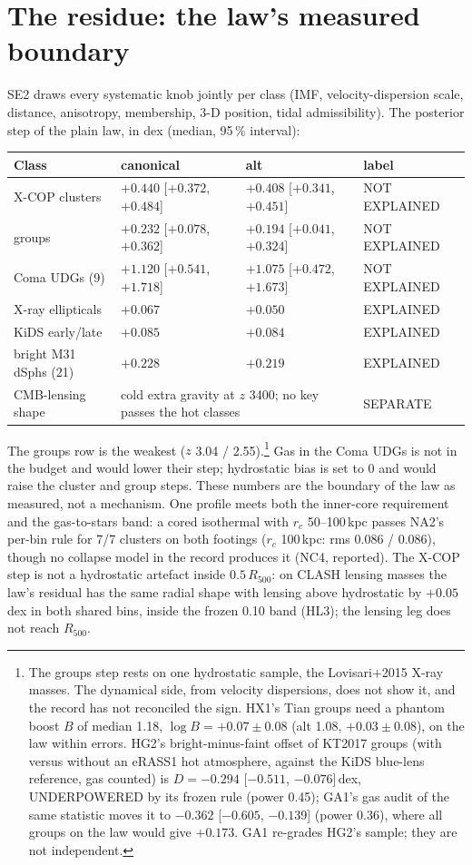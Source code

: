 \documentclass[10pt]{article}
\begin{document}
\section{The residue: the law's measured boundary}
SE2 draws every systematic knob jointly per class (IMF, velocity-dispersion scale, distance, anisotropy, membership, 3-D position, tidal admissibility). The posterior step of the plain law, in dex (median, 95\,\% interval):
\begin{center}\small
\begin{tabular}{@{}llll@{}}\toprule
Class & canonical & alt & label\\\midrule
X-COP clusters & $+0.440$ [$+0.372$, $+0.484$] & $+0.408$ [$+0.341$, $+0.451$] & NOT EXPLAINED\\
groups & $+0.232$ [$+0.078$, $+0.362$] & $+0.194$ [$+0.041$, $+0.324$] & NOT EXPLAINED\\
Coma UDGs (9) & $+1.120$ [$+0.541$, $+1.718$] & $+1.075$ [$+0.472$, $+1.673$] & NOT EXPLAINED\\
X-ray ellipticals & $+0.067$ & $+0.050$ & EXPLAINED\\
KiDS early/late & $+0.085$ & $+0.084$ & EXPLAINED\\
bright M31 dSphs (21) & $+0.228$ & $+0.219$ & EXPLAINED\\
CMB-lensing shape & \multicolumn{2}{l}{cold extra gravity at $z$ 3400; no key passes the hot classes} & SEPARATE\\\bottomrule
\end{tabular}\end{center}
The groups row is the weakest ($z$ 3.04 / 2.55).\footnote{The groups step rests on one hydrostatic sample, the Lovisari+2015 X-ray masses. The dynamical side, from velocity dispersions, does not show it, and the record has not reconciled the sign. HX1's Tian groups need a phantom boost $B$ of median 1.18, $\log B=+0.07\pm0.08$ (alt 1.08, $+0.03\pm0.08$), on the law within errors. HG2's bright-minus-faint offset of KT2017 groups (with versus without an eRASS1 hot atmosphere, against the KiDS blue-lens reference, gas counted) is $D=-0.294$ [$-0.511$, $-0.076$]\,dex, UNDERPOWERED by its frozen rule (power 0.45); GA1's gas audit of the same statistic moves it to $-0.362$ [$-0.605$, $-0.139$] (power 0.36), where all groups on the law would give $+0.173$. GA1 re-grades HG2's sample; they are not independent.} Gas in the Coma UDGs is not in the budget and would lower their step; hydrostatic bias is set to 0 and would raise the cluster and group steps. These numbers are the boundary of the law as measured, not a mechanism. One profile meets both the inner-core requirement and the gas-to-stars band: a cored isothermal with $r_c$ 50--100\,kpc passes NA2's per-bin rule for 7/7 clusters on both footings ($r_c$ 100\,kpc: rms 0.086 / 0.086), though no collapse model in the record produces it (NC4, reported). The X-COP step is not a hydrostatic artefact inside $0.5\,R_{500}$: on CLASH lensing masses the law's residual has the same radial shape with lensing above hydrostatic by $+0.05$\,dex in both shared bins, inside the frozen 0.10 band (HL3); the lensing leg does not reach $R_{500}$.
\end{document}
